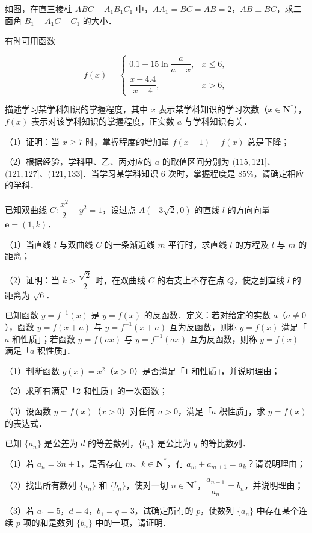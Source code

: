 \Needspace{0.4\textheight}
\begin{question}
如图，在直三棱柱 $ABC-A_1B_1C_1$ 中，$AA_1=BC=AB=2$，$AB\perp BC$，求二面角 $B_1-A_1C-C_1$ 的大小．
\nopagebreak[4]
\begin{center}\end{center}
\nopagebreak[4]
\end{question}
\begin{question}
有时可用函数

\nopagebreak[4]
\[f(x)=\begin{cases}0.1+15\ln\dfrac{a}{a-x},&x\leqslant6,\\[6pt] \dfrac{x-4.4}{x-4},&x>6,\end{cases}\]

描述学习某学科知识的掌握程度，其中 $x$ 表示某学科知识的学习次数（$x\in\mathbf N^*$），$f(x)$ 表示对该学科知识的掌握程度，正实数 $a$ 与学科知识有关．

（1）证明：当 $x\geqslant7$ 时，掌握程度的增加量 $f(x+1)-f(x)$ 总是下降；

（2）根据经验，学科甲、乙、丙对应的 $a$ 的取值区间分别为 $(115,121]$、$(121,127]$、$(121,133]$．当学习某学科知识 $6$ 次时，掌握程度是 $85\%$，请确定相应的学科．

\end{question}
\begin{question}
已知双曲线 $C:\dfrac{x^2}{2}-y^2=1$，设过点 $A(-3\sqrt2,0)$ 的直线 $l$ 的方向向量 $\boldsymbol e=(1,k)$．

（1）当直线 $l$ 与双曲线 $C$ 的一条渐近线 $m$ 平行时，求直线 $l$ 的方程及 $l$ 与 $m$ 的距离；

（2）证明：当 $k>\dfrac{\sqrt2}{2}$ 时，在双曲线 $C$ 的右支上不存在点 $Q$，使之到直线 $l$ 的距离为 $\sqrt6$．

\end{question}
\begin{question}
已知函数 $y=f^{-1}(x)$ 是 $y=f(x)$ 的反函数．定义：若对给定的实数 $a$（$a\neq0$），函数 $y=f(x+a)$ 与 $y=f^{-1}(x+a)$ 互为反函数，则称 $y=f(x)$ 满足「$a$ 和性质」；若函数 $y=f(ax)$ 与 $y=f^{-1}(ax)$ 互为反函数，则称 $y=f(x)$ 满足「$a$ 积性质」．

（1）判断函数 $g(x)=x^2$（$x>0$）是否满足「$1$ 和性质」，并说明理由；

（2）求所有满足「$2$ 和性质」的一次函数；

（3）设函数 $y=f(x)$（$x>0$）对任何 $a>0$，满足「$a$ 积性质」，求 $y=f(x)$ 的表达式．

\end{question}
\begin{question}
已知 $\{a_n\}$ 是公差为 $d$ 的等差数列，$\{b_n\}$ 是公比为 $q$ 的等比数列．

（1）若 $a_n=3n+1$，是否存在 $m$、$k\in\mathbf N^*$，有 $a_m+a_{m+1}=a_k$？请说明理由；

（2）找出所有数列 $\{a_n\}$ 和 $\{b_n\}$，使对一切 $n\in\mathbf N^*$，$\dfrac{a_{n+1}}{a_n}=b_n$，并说明理由；

（3）若 $a_1=5$，$d=4$，$b_1=q=3$，试确定所有的 $p$，使数列 $\{a_n\}$ 中存在某个连续 $p$ 项的和是数列 $\{b_n\}$ 中的一项，请证明．

\end{question}